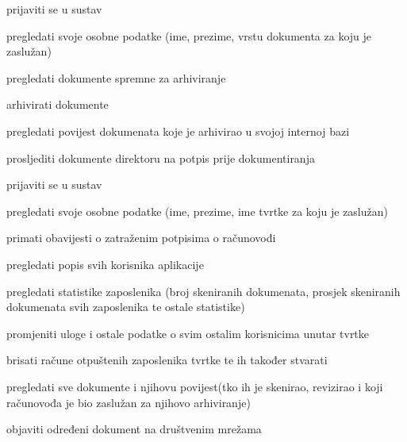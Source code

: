 \begin{packed_enum}
				\item  {}
				\begin{packed_enum}
					
					\item prijaviti se u sustav
					\item pregledati svoje osobne podatke (ime, prezime, vrstu dokumenta za koju je zaslužan)
					\item pregledati dokumente spremne za arhiviranje
					\item arhivirati dokumente
					\item pregledati povijest dokumenata koje je arhivirao u svojoj internoj bazi
					\item prosljediti dokumente direktoru na potpis prije dokumentiranja 
					
				\end{packed_enum}
				
				\item  {}
				\begin{packed_enum}
					
					\item prijaviti se u sustav
					\item pregledati svoje osobne podatke (ime, prezime, ime tvrtke za koju je zaslužan)
					\item primati obavijesti o zatraženim potpisima o računovođi
					\item pregledati popis svih korisnika aplikacije
					\item pregledati statistike zaposlenika (broj skeniranih dokumenata,
					prosjek skeniranih dokumenata svih zaposlenika te ostale statistike)
					\item promjeniti uloge i ostale podatke o svim ostalim korisnicima unutar tvrtke 
					\item brisati račune otpuštenih zaposlenika tvrtke te ih također stvarati 
					\item pregledati sve dokumente i njihovu povijest(tko ih je skenirao, 
					revizirao i koji računovođa je bio zaslužan za njihovo arhiviranje)
					\item objaviti određeni dokument na društvenim mrežama
					
				\end{packed_enum}
				
				\item  {}
				\begin{packed_enum}
					

\end{packed_enum}
\end{packed_enum}
